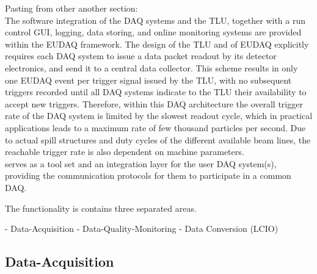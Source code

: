 
\newcommand{\subeventtype}{Sub-Event-Type }
\newcommand{\tcp}{TCP/IP }
\newcommand{\dataconverterplugin}{Data-Converter-Plugin }
\newcommand{\eventid}{Event-ID }
\newcommand{\cpp}{C++ }
\newcommand{\producer}{producer }
\newcommand{\eventtype}{Event-Type }
\newcommand{\event}{Event }
\newcommand{\eventheader}{Event-Header }
\newcommand{\timestamp}{Time-Stamp }
\newcommand{\rawdata}{Raw-Data }
\newcommand{\datablock}{Data-Block }
\newcommand{\da}{Data-Acquisition }
\newcommand{\dc}{Data-Collector }
\newcommand{\onlinemon}{Online-Monitor }
\newcommand{\hitmaps}{Hit-Maps }
\newcommand{\corplots}{Correlation-Plots }
\newcommand{\offlineana}{Offline-Analysis }
\newcommand{\filewriter}{File-Writer }
\newcommand{\rc}{Run-Control }
\newcommand{\testrc}{TestRunControl }
\newcommand{\logcollector}{Log-Collector }


Pasting  from other another section:\\

The software integration of the DAQ systems and the TLU, together with a run control GUI, logging, data storing, and online monitoring systems are provided within the EUDAQ framework.
The design of the TLU and of EUDAQ explicitly requires each DAQ system to issue a data packet readout by its detector electronics, and send it to a central data collector. 
This scheme results in only one EUDAQ event per trigger signal issued by the TLU, with no subsequent triggers recorded until all DAQ systems indicate to the TLU their availability to accept new triggers.
Therefore, within this DAQ architecture the overall trigger rate of the DAQ system is limited by the slowest readout cycle,
 which in practical applications leads to a maximum rate of few thousand particles per second. 
Due to actual spill structures and duty cycles of the different available beam lines, the reachable trigger rate is also dependent on machine parameters. \\

\eudaq serves as a tool set and an integration layer for the user DAQ system(s), providing the communication protocols for them to participate in a common DAQ. 


The functionality is contains three separated areas. 

- Data-Acquisition
- Data-Quality-Monitoring 
- Data Conversion (LCIO)

\subsection{Data-Acquisition}



